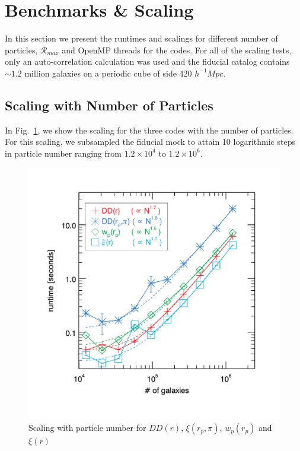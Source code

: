 \documentclass[preprint, 12pt, authoryear]{elsarticle}
\newcommand{\hMpc}{\ensuremath{{h^{-1}Mpc}\xspace}}
\newcommand{\rmax}{\ensuremath{{{\mathcal{R}}_{max}}}\xspace}
\newcommand{\xir}{\ensuremath{{DD(r)}}\xspace}
\newcommand{\xiofr}{\ensuremath{{\xi(r)}}\xspace}
\newcommand{\wprp}{\ensuremath{{w_p(r_p)}}\xspace}
\newcommand{\xirppi}{\ensuremath{{\xi(r_p,\pi)}}\xspace}
\begin{document}
\section{Benchmarks \& Scaling}
In this section we present the runtimes and scalings for different number of particles, \rmax and OpenMP threads for the codes. 
For all of the scaling tests, only an auto-correlation calculation was used and the fiducial catalog contains $\sim 1.2$ million 
galaxies on a periodic cube of side 420 \hMpc. 

\subsection{Scaling with Number of Particles}
In Fig.~\ref{fig:scaling_numpart}, we show the scaling for the three codes with the number of particles. For this scaling, we subsampled 
the fiducial mock to attain 10 logarithmic steps in particle number ranging from $1.2\times10^4$ to $1.2\times10^6$. 

\begin{figure}[htbp]
\includegraphics[clip=true,width=\linewidth]{timings_Mr19_numpart}%
\caption{Scaling with particle number for \xir, \xirppi, \wprp and \xiofr}
\label{fig:scaling_numpart}
\end{figure}
\end{document}
